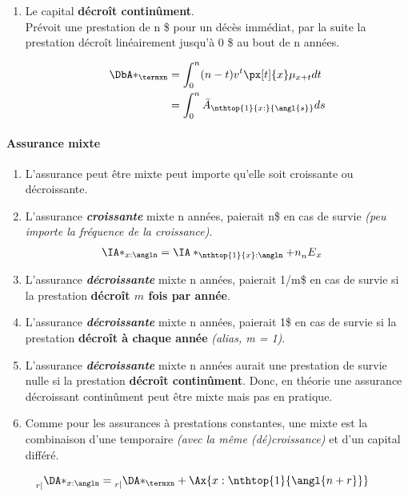 \documentclass[10pt, french]{article}
\begin{document}
\begin{multicols*}{3}
\begin{enumerate}
	\item[] Le capital \textbf{décroît continûment}.\\
	Prévoit une prestation de n \$ pour un décès immédiat, par la suite la prestation décroît linéairement jusqu'à 0 \$ au bout de n années.

\begin{align*}
	\DbA*_{\termxn} &= \int_0^{n} (n - t) v^t \px[t]{x} \mu_{x+t} dt \\
	&= \int_0^{n} \bar{A}_{\nthtop{1}{x:}{\angl{s}}} ds
\end{align*}

\end{enumerate}

\paragraph{Assurance mixte}

\begin{enumerate}
	\item[] L'assurance peut être mixte peut importe qu'elle soit croissante ou décroissante.
	\item[] L'assurance \textit{\textbf{croissante}} mixte n années, paierait n\$ en cas de survie \textit{(peu importe la fréquence de la croissance)}.
	\begin{align*}
		\IA*_{x:\angln} &= \IA*_{\nthtop{1}{x}:\angln}  + n {\prescript{}{n}E_{x}} 
	\end{align*}
	\item[] L'assurance \textit{\textbf{décroissante}} mixte n années, paierait 1/m\$ en cas de survie si la prestation \textbf{décroît $m$ fois par année}.
	\item[] L'assurance \textit{\textbf{décroissante}} mixte n années, paierait 1\$ en cas de survie si la prestation \textbf{décroît à chaque année} \textit{(alias, m = 1)}.
	\item[] L'assurance \textit{\textbf{décroissante}} mixte n années aurait une prestation de survie nulle si la prestation \textbf{décroît continûment}. Donc, en théorie une assurance décroissant continûment peut être mixte mais pas en pratique.
	\item[] Comme pour les assurances à prestations constantes, une mixte est la combinaison d'une temporaire \textit{(avec la même (dé)croissance)} et d'un capital différé.
\end{enumerate}

\begin{align*}
	\prescript{}{r|}{\DA*_{x:\angln}} &= \prescript{}{r|}{\DA*_{\termxn}} + \Ax{x:\nthtop{1}{\angl{n + r}}}
\end{align*}


\end{multicols*}
\end{document}
